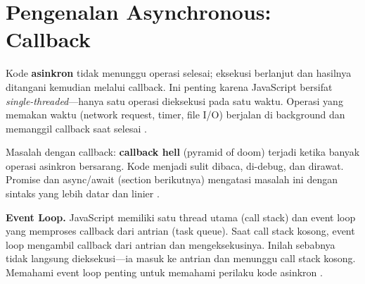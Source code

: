 \section{Pengenalan Asynchronous: Callback}

Kode \textbf{asinkron} tidak menunggu operasi selesai; eksekusi berlanjut dan hasilnya ditangani kemudian melalui callback. Ini penting karena JavaScript bersifat \textit{single-threaded}---hanya satu operasi dieksekusi pada satu waktu. Operasi yang memakan waktu (network request, timer, file I/O) berjalan di background dan memanggil callback saat selesai \cite{jsInfo}.

Masalah dengan callback: \textbf{callback hell} (pyramid of doom) terjadi ketika banyak operasi asinkron bersarang. Kode menjadi sulit dibaca, di-debug, dan dirawat. Promise dan async/await (section berikutnya) mengatasi masalah ini dengan sintaks yang lebih datar dan linier \cite{eloquentJs}.

\begin{catatan}
\textbf{Event Loop.} JavaScript memiliki satu thread utama (call stack) dan event loop yang memproses callback dari antrian (task queue). Saat call stack kosong, event loop mengambil callback dari antrian dan mengeksekusinya. Inilah sebabnya  tidak langsung dieksekusi---ia masuk ke antrian dan menunggu call stack kosong. Memahami event loop penting untuk memahami perilaku kode asinkron \cite{mdnJsGuide}.
\end{catatan}

